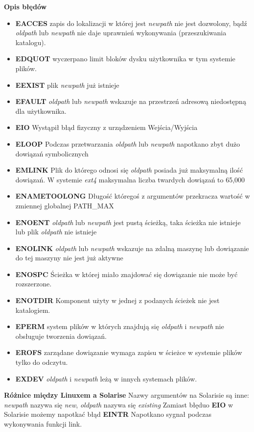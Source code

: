 \documentclass{article}
\begin{document}
\textbf{Opis błędów}
\begin{itemize}
\item \textbf{EACCES} zapis do lokalizacji w której jest \textit{newpath} nie jest dozwolony, bądź \textit{oldpath} lub \textit{newpath} nie daje uprawnień wykonywania (przeszukiwania katalogu).
\item \textbf{EDQUOT} wyczerpano limit bloków dysku użytkownika w tym systemie plików.
\item \textbf{EEXIST} plik \textit{newpath} już istnieje
\item \textbf{EFAULT} \textit{oldpath} lub \textit{newpath} wskazuje na przestrzeń adresową niedostępną dla użytkownika.
\item \textbf{EIO} Wystąpił błąd fizyczny z urządzeniem Wejścia/Wyjścia
\item \textbf{ELOOP} Podczas przetwarzania \textit{oldpath} lub \textit{newpath} napotkano zbyt dużo dowiązań symbolicznych
\item \textbf{EMLINK} Plik do którego odnosi się \textit{oldpath} posiada już maksymalną ilość dowiązań. W systemie \textit{ext4} maksymalna liczba twardych dowiązań to 65,000 
\item \textbf{ENAMETOOLONG} Długość któregoś z argumentów 
przekracza wartość w zmiennej globalnej PATH\_MAX
\item \textbf{ENOENT}  \textit{oldpath} lub \textit{newpath} jest pustą ścieżką, taka ścieżka nie istnieje lub plik  \textit{oldpath} nie istnieje
\item \textbf{ENOLINK}  \textit{oldpath} lub \textit{newpath} wskazuje na zdalną maszynę lub dowiązanie do tej maszyny nie jest już aktywne
\item \textbf{ENOSPC}  Ścieżka w której miało znajdować się dowiązanie nie może być rozszerzone.
\item \textbf{ENOTDIR}  Komponent użyty w jednej z podanych ścieżek nie jest katalogiem.
\item \textbf{EPERM} system plików w których znajdują się \textit{oldpath} i \textit{newpath} nie obsługuje tworzenia dowiązań.
\item \textbf{EROFS} zarządane dowiązanie wymaga zapisu w ścieżce w systemie plików tylko do odczytu.

\item \textbf{EXDEV} \textit{oldpath} i \textit{newpath} leżą w innych systemach plików.


\end{itemize}
\textbf{Różnice między Linuxem a Solarise}
Nazwy argumentów na Solarisie są inne:
\textit{newpath} nazywa się \textit{new},
\textit{oldpath} nazywa się \textit{existing}
Zamiast błęduo \textbf{EIO} w Solarisie możemy napotkać błąd
\textbf{EINTR} Napotkano sygnał podczas wykonywania funkcji link.
\end{document}
